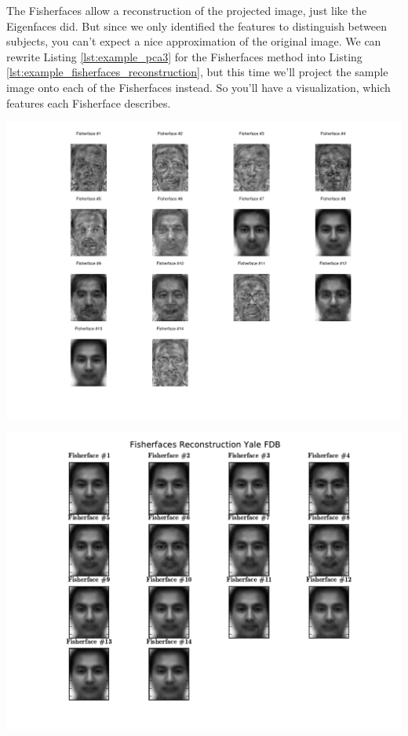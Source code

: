 The Fisherfaces allow a reconstruction of the projected image, just like the Eigenfaces did. But since we only identified the features to distinguish between subjects, you can't expect a nice approximation of the original image. We can rewrite Listing \ref{lst:example_pca3} for the Fisherfaces method into Listing \ref{lst:example_fisherfaces_reconstruction}, but this time we'll project the sample image onto each of the Fisherfaces instead. So you'll have a visualization, which features each Fisherface describes.

\ifx\python\undefined
	
\else
	
\fi


\ifx\python\undefined
	\begin{center}
		\includegraphics[scale=0.6]{img/fisherfaces/octave_fisherfaces_reconstruction}
	\end{center}
\else
	\begin{center}
		\includegraphics[scale=0.6]{img/fisherfaces/python_fisherfaces_reconstruction}
	\end{center}
\fi

